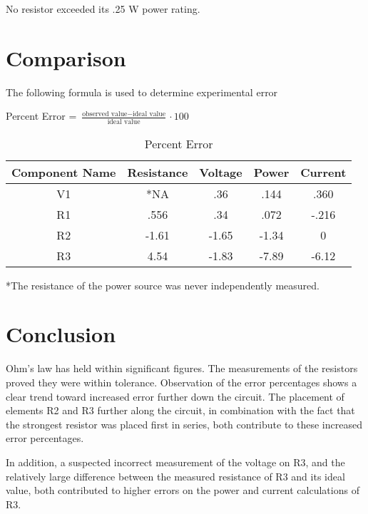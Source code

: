 \documentclass[journal]{IEEEtran}
\begin{document}
No resistor exceeded its .25 W power rating.

\section{Comparison}

The following formula is used to determine experimental error

Percent Error = $\frac{\textrm{observed value} - \textrm{ideal value}}{\textrm{ideal value}}\cdot 100$

\begin{table}[h!]
\renewcommand{\arraystretch}{1.5}
\caption{Percent Error}
\label{table_error}
\centering
\begin{tabular}{|c|c|c|c|c|}
\hline
Component Name & Resistance & Voltage & Power & Current\\
\hline
V1 & *NA & .36 & .144 & .360\\
\hline
R1 & .556 & .34 & .072 & -.216\\
\hline
R2 & -1.61 & -1.65 & -1.34 & 0\\
\hline
R3 & 4.54  & -1.83 & -7.89 & -6.12\\
\hline
\end{tabular}
\end{table}

*The resistance of the power source was never independently measured.

\section{Conclusion}

Ohm's law has held within significant figures. The measurements of the resistors proved
they were within tolerance. Observation of the error percentages shows a clear trend
toward increased error further down the circuit. The placement of elements R2 and R3 further 
along the circuit, in combination with the fact that the strongest resistor was placed 
first in series, both contribute to these increased error percentages. 

In addition, a suspected incorrect measurement of the voltage on R3, and the relatively 
large difference between the measured resistance of R3 and its ideal value, both 
contributed to higher errors on the power and current calculations of R3.

\end{document}

